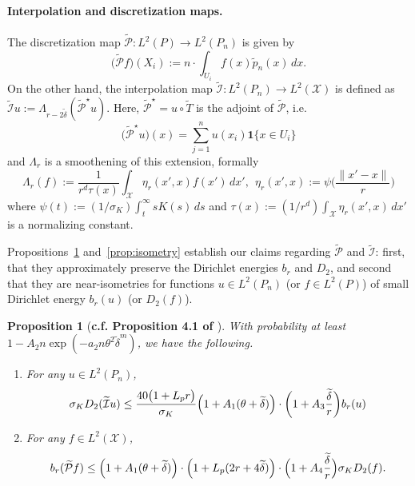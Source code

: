 \documentclass{article}
\newcommand{\1}{\mathbf{1}}
\newcommand{\Xset}{\mathcal{X}}
\newcommand{\Leb}{L}
\newcommand{\mc}[1]{\mathcal{#1}}
\newcommand{\wt}[1]{\widetilde{#1}}
\theoremstyle{alden}
\theoremstyle{aldenthm}
\newtheorem{proposition}{Proposition}
\theoremstyle{definition}
\theoremstyle{remark}
\begin{document}
\paragraph{Interpolation and discretization maps.}

The discretization map  $\wt{\mathcal{P}}: \Leb^2(P) \to \Leb^2(P_n)$ is given by
\begin{equation*}
\bigl(\wt{\mathcal{P}}f\bigr)(X_i) := n \cdot \int_{U_i} f(x) \wt{p}_n(x) \,dx.
\end{equation*}
On the other hand, the interpolation map $\wt{\mc{I}}: \Leb^2(P_n) \to \Leb^2(\Xset)$ is defined as $\wt{\mc{I}}u := \Lambda_{r - 2\wt{\delta}}(\wt{\mc{P}}^{\star}u)$. Here, $\wt{\mc{P}}^{\star} = u \circ \wt{T}$ is the adjoint of $\wt{\mc{P}}$, i.e.
\begin{equation*}
\bigl(\wt{\mc{P}}^{\star}u\bigr)(x) = \sum_{j = 1}^{n} u(x_i) \1\{x \in U_i\} 
\end{equation*} 
and $\Lambda_r$ is a smoothening of this extension, formally
\begin{equation*}
\Lambda_r(f) := \frac{1}{r^d\tau(x)}\int_{\Xset} \eta_r(x',x) f(x') \,dx',~~ \eta_r(x',x) := \psi\biggl(\frac{\|x' - x\|}{r}\biggr)
\end{equation*}
where $\psi(t) := (1/\sigma_K)\int_{t}^{\infty} s K(s) \,ds$ and $\tau(x) := (1/r^d)\int_{\Xset} \eta_r(x',x) \,dx'$ is a normalizing constant.

Propositions~\ref{prop:dirichlet_energies} and~\ref{prop:isometry} establish our claims regarding $\wt{\mc{P}}$ and $\wt{\mc{I}}$: first, that they approximately preserve the Dirichlet energies $b_r$ and $D_2$, and second that they are near-isometries for functions $u \in \Leb^2(P_n)$ (or $f \in \Leb^2(P)$) of small Dirichlet energy $b_r(u)$ (or $D_2(f)$).

\begin{proposition}[\textbf{c.f. Proposition 4.1 of \citet{calder2019}}]
	\label{prop:dirichlet_energies}
	With probability at least $1 - A_2n\exp(-a_2n\theta^2\wt{\delta}^{m})$, we have the following.
	\begin{enumerate}[(1)]
		\item For any $u \in \Leb^2(P_n)$,
		\begin{equation*}
		\sigma_{K} D_2(\wt{\mc{I}}u) \leq \frac{40 \bigl(1 + L_p r\bigr)}{\sigma_K} \Bigl(1 + A_1(\theta + \wt{\delta})\Bigr) \cdot \biggl(1 + A_3\frac{\wt{\delta}}{r}\biggr) b_r(u)
		\end{equation*}
		\item For any $f \in \Leb^2(\Xset)$,
		\begin{equation*}
		b_r(\wt{\mc{P}}f) \leq \Bigl(1 + A_1(\theta + \wt{\delta})\Bigr) \cdot \Bigl(1 + L_p(2r + 4\wt{\delta})\Bigr) \cdot \Bigl(1 + A_4\frac{\wt{\delta}}{r}\Bigr) \sigma_{K} D_2(f).
		\end{equation*}
	\end{enumerate}
\end{proposition}
\end{document}
